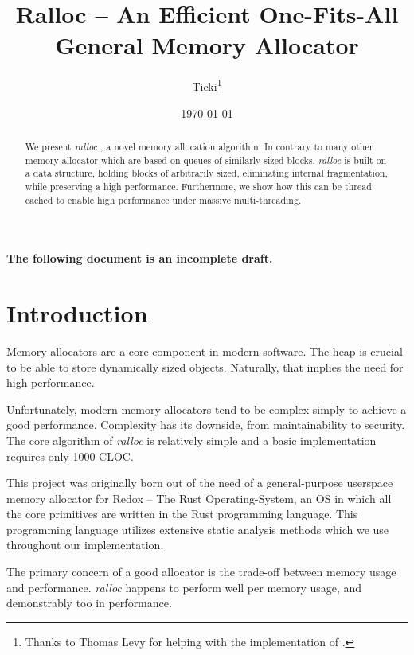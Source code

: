 \documentclass[11pt]{article}
\title{Ralloc -- An Efficient One-Fits-All General Memory Allocator}
\author{Ticki\thanks{Thanks to Thomas Levy for helping with the implementation of \ralloc.}}
\date{\today}
\newcommand{\ralloc}{\emph{ralloc} }
\begin{document}

    \begin{titlepage}
        \centering \huge\bfseries The following document is an incomplete draft.
    \end{titlepage}


    \maketitle

    \begin{abstract}
        We present \ralloc, a novel memory allocation algorithm. In contrary to
        many other memory allocator which are based on queues of similarly
        sized blocks. \ralloc is built on a data structure, holding blocks of
        arbitrarily sized, eliminating internal fragmentation, while preserving
        a high performance. Furthermore, we show how this can be thread cached
        to enable high performance under massive multi-threading.
    \end{abstract}

    \section{Introduction}
    Memory allocators are a core component in modern software. The heap is
    crucial to be able to store dynamically sized objects. Naturally, that
    implies the need for high performance.

    Unfortunately, modern memory allocators tend to be complex simply to
    achieve a good performance. Complexity has its downside, from
    maintainability to security. The core algorithm of \ralloc is relatively
    simple and a basic implementation requires only 1000 CLOC.

    This project was originally born out of the need of a general-purpose
    userspace memory allocator for Redox -- The Rust
    Operating-System\cite{redoxweb}, an OS in which all the core primitives are
    written in the Rust programming language\cite{rustweb}.  This programming
    language utilizes extensive static analysis methods which we use throughout
    our implementation.

    The primary concern of a good allocator is the trade-off between memory
    usage and performance. \ralloc happens to perform well per memory usage,
    and demonstrably too in performance.
\end{document}
